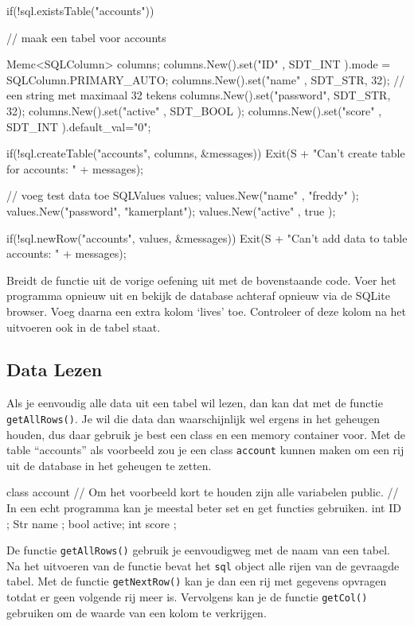\begin{code}
if(!sql.existsTable("accounts")) {
  // maak een tabel voor accounts
	
	Memc<SQLColumn> columns;
	columns.New().set("ID"      , SDT_INT    ).mode = SQLColumn.PRIMARY_AUTO;
	columns.New().set("name"    , SDT_STR, 32); // een string met maximaal 32 tekens
	columns.New().set("password", SDT_STR, 32);
	columns.New().set("active"  , SDT_BOOL   );
	columns.New().set("score"   , SDT_INT    ).default_val="0";
	
	if(!sql.createTable("accounts", columns, &messages)) {
	  Exit(S + "Can't create table for accounts: \n" + messages);
	}
	
	// voeg test data toe
	SQLValues values;
	values.New("name"    , "freddy"    );
	values.New("password", "kamerplant");
	values.New("active"  , true        );
	
	if(!sql.newRow("accounts", values, &messages)) {
	  Exit(S + "Can't add data to table accounts: \n" + messages);
	}
}
\end{code}

\begin{exercise}
Breidt de functie  uit de vorige oefening uit met de bovenstaande code. Voer het programma opnieuw uit en bekijk de database achteraf opnieuw via de SQLite browser. Voeg daarna een extra kolom `lives' toe. Controleer of deze kolom na het uitvoeren ook in de tabel staat.
\end{exercise}

\subsection{Data Lezen}
Als je eenvoudig alle data uit een tabel wil lezen, dan kan dat met de functie \texttt{getAllRows()}. Je wil die data dan waarschijnlijk wel ergens in het geheugen houden, dus daar gebruik je best een class en een memory container voor. Met de table ``accounts'' als voorbeeld zou je een class \texttt{account} kunnen maken om een rij uit de database in het geheugen te zetten.

\begin{code}
class account {
  // Om het voorbeeld kort te houden zijn alle variabelen public.
	// In een echt programma kan je meestal beter set en get functies gebruiken.
	int  ID    ; 
	Str  name  ;
	bool active;
	int  score ;
}
\end{code}

De functie \texttt{getAllRows()} gebruik je eenvoudigweg met de naam van een tabel. Na het uitvoeren van de functie bevat het \texttt{sql} object alle rijen van de gevraagde tabel. Met de functie \texttt{getNextRow()} kan je dan een rij met gegevens opvragen totdat er geen volgende rij meer is. Vervolgens kan je de functie \texttt{getCol()} gebruiken om de waarde van een kolom te verkrijgen. 

